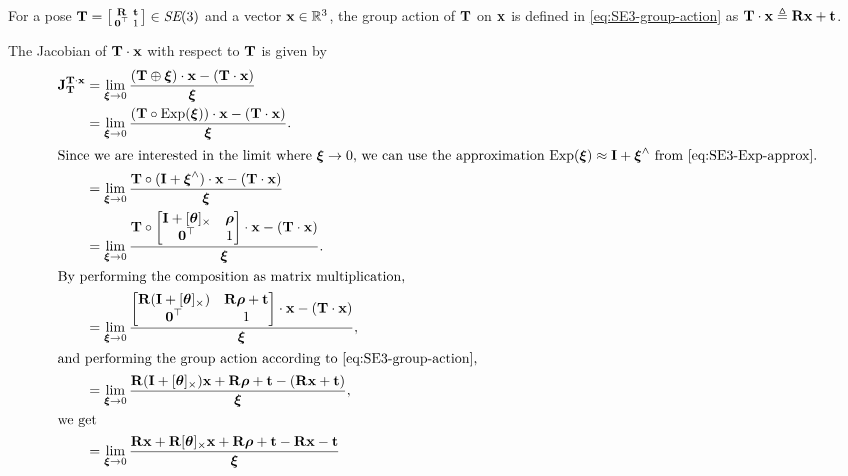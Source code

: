 \begin{example}[frametitle=Computing the Jacobians for $\matT \cdot \vecx$] \label{ex:lie-group-action-jac-SE3-example}
For a pose ${\boldsymbol{\mathbf{T}}} = \begin{bsmallmatrix} {\boldsymbol{\mathbf{R}}} & {\boldsymbol{\mathbf{t}}}\\ \boldsymbol{\mathbf{0}}^{\top} & 1 \end{bsmallmatrix} \in \textit{SE}(3)$ and a vector ${\boldsymbol{\mathbf{x}}} \in {\mathbb R}^3$, the group action of ${\boldsymbol{\mathbf{T}}}$ on ${\boldsymbol{\mathbf{x}}}$ is defined in \eqref{eq:SE3-group-action} as ${\boldsymbol{\mathbf{T}}} \cdot {\boldsymbol{\mathbf{x}}} \triangleq {\boldsymbol{\mathbf{R}}} {\boldsymbol{\mathbf{x}}} + {\boldsymbol{\mathbf{t}}}$.

The Jacobian of $\matT \cdot \vecx$ with respect to ${\boldsymbol{\mathbf{T}}}$ is given by
\begin{subequations}
\begin{align}
  \jac{\matT \cdot \vecx}{\matT} &= \lim_{\vecxi \to 0} 
  \frac{(\matT \oplus \vecxi) \cdot \vecx - (\matT \cdot \vecx)}{\vecxi}\\
  &= \lim_{\vecxi \to 0} 
  \frac{(\matT \circ \Exp(\vecxi)) \cdot \vecx - (\matT \cdot \vecx)}{\vecxi}.\\
  \intertext{Since we are interested in the limit where $\vecxi \to 0$, we can use the approximation $\Exp(\vecxi) \approx \matI + \vecxi^\wedge$ from \eqref{eq:SE3-Exp-approx}.}
  &= \lim_{\vecxi \to 0} 
  \frac{\matT \circ (\matI + \vecxi^\wedge) \cdot \vecx - (\matT \cdot \vecx)}{\vecxi}\\
  &= \lim_{\vecxi \to 0} 
  \frac{ \matT \circ
  \begin{bmatrix}
    \matI + \skewsymm{\vectheta} & \vecrho\\
    \matr{0}\trans & 1
  \end{bmatrix} \cdot \vecx - (\matT \cdot \vecx)}{\vecxi}.\\
  \intertext{By performing the composition as matrix multiplication,}
  &= \lim_{\vecxi \to 0} 
  \frac{
  \begin{bmatrix}
    \matR(\matI + \skewsymm{\vectheta}) & \matR\vecrho + \vect\\
    \matr{0}\trans & 1
  \end{bmatrix} \cdot \vecx - (\matT \cdot \vecx)}{\vecxi},\\
  \intertext{and performing the group action according to \eqref{eq:SE3-group-action},}
  &= \lim_{\vecxi \to 0} 
  \frac{\matR(\matI + [\vectheta]_\times)\vecx + \matR\vecrho + \vect - (\matR\vecx + \vect)}{\vecxi},\\
  \intertext{we get}
  &= \lim_{\vecxi \to 0} 
  \frac{\matR\vecx + \matR\skewsymm{\vectheta}\vecx + \matR\vecrho + \vect - \matR\vecx - \vect}{\vecxi}\\

\end{align}
\end{subequations}
\end{example}
